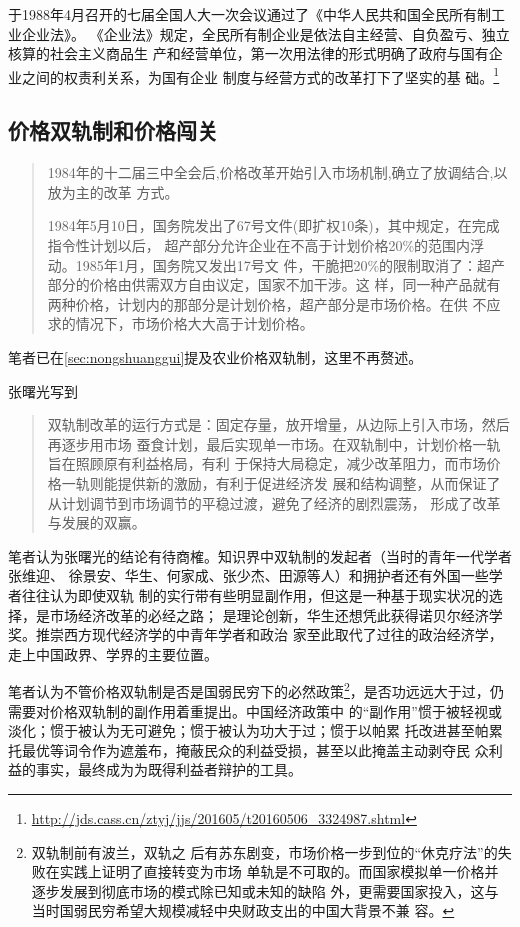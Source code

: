 于1988年4月召开的七届全国人大一次会议通过了《中华人民共和国全民所有制工业企业法》。
《企业法》规定，全民所有制企业是依法自主经营、自负盈亏、独立核算的社会主义商品生
产和经营单位，第一次用法律的形式明确了政府与国有企业之间的权责利关系，为国有企业
制度与经营方式的改革打下了坚实的基
础。\footnote{\url{http://jds.cass.cn/ztyj/jjs/201605/t20160506_3324987.shtml}}


\subsection{价格双轨制和价格闯关}
\label{sec:qishuanggui}

\begin{quotation}
  1984年的十二届三中全会后,价格改革开始引入市场机制,确立了放调结合,以放为主的改革
  方式。\cite{wangqiangshehui}

  1984年5月10日，国务院发出了67号文件(即扩权10条)，其中规定，在完成指令性计划以后，
  超产部分允许企业在不高于计划价格20\%的范围内浮动。1985年1月，国务院又发出17号文
  件，干脆把20\%的限制取消了：超产部分的价格由供需双方自由议定，国家不加干涉。这
  样，同一种产品就有两种价格，计划内的那部分是计划价格，超产部分是市场价格。在供
  不应求的情况下，市场价格大大高于计划价格。\cite{yangshuanggui}
\end{quotation}

笔者已在\cref{sec:nongshuanggui}提及农业价格双轨制，这里不再赘述。

张曙光写到
\begin{quotation}
  双轨制改革的运行方式是：固定存量，放开增量，从边际上引入市场，然后再逐步用市场
  蚕食计划，最后实现单一市场。在双轨制中，计划价格一轨旨在照顾原有利益格局，有利
  于保持大局稳定，减少改革阻力，而市场价格一轨则能提供新的激励，有利于促进经济发
  展和结构调整，从而保证了从计划调节到市场调节的平稳过渡，避免了经济的剧烈震荡，
  形成了改革与发展的双赢。
\end{quotation}

笔者认为张曙光的结论有待商榷。知识界中双轨制的发起者（当时的青年一代学者张维迎、
徐景安、华生、何家成、张少杰、田源等人）和拥护者还有外国一些学者往往认为即使双轨
制的实行带有些明显副作用，但这是一种基于现实状况的选择，是市场经济改革的必经之路；
是理论创新，华生还想凭此获得诺贝尔经济学奖。推崇西方现代经济学的中青年学者和政治
家至此取代了过往的政治经济学，走上中国政界、学界的主要位置。

笔者认为不管价格双轨制是否是国弱民穷下的必然政策\footnote{双轨制前有波兰，双轨之
  后有苏东剧变，市场价格一步到位的“休克疗法”的失败在实践上证明了直接转变为市场
  单轨是不可取的。而国家模拟单一价格并逐步发展到彻底市场的模式除已知或未知的缺陷
  外，更需要国家投入，这与当时国弱民穷希望大规模减轻中央财政支出的中国大背景不兼
  容。}，是否功远远大于过，仍需要对价格双轨制的副作用着重提出。中国经济政策中
的“副作用”惯于被轻视或淡化；惯于被认为无可避免；惯于被认为功大于过；惯于以帕累
托改进甚至帕累托最优等词令作为遮羞布，掩蔽民众的利益受损，甚至以此掩盖主动剥夺民
众利益的事实，最终成为为既得利益者辩护的工具。

